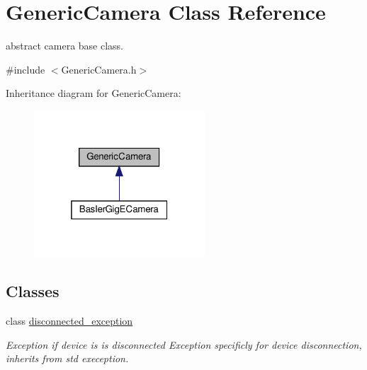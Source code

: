 \hypertarget{classGenericCamera}{}\section{Generic\+Camera Class Reference}
\label{classGenericCamera}


abstract camera base class.  




{\ttfamily \#include $<$Generic\+Camera.\+h$>$}



Inheritance diagram for Generic\+Camera\+:\nopagebreak
\begin{figure}[H]
\begin{center}
\leavevmode
\includegraphics[width=181pt]{classGenericCamera__inherit__graph}
\end{center}
\end{figure}
\subsection*{Classes}
\begin{DoxyCompactItemize}
\item 
class \hyperlink{classGenericCamera_1_1disconnected__exception}{disconnected\+\_\+exception}
\begin{DoxyCompactList}\small\item\em Exception if device is is disconnected Exception specificly for device disconnection, inherits from std exeception. \end{DoxyCompactList}\end{DoxyCompactItemize}
